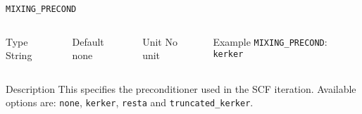 \documentclass[xcolor=dvipsnames,t]{beamer}
\begin{document}
\begin{frame}[allowframebreaks]{\texttt{MIXING\_PRECOND}} \label{MIXING_PRECOND}
\vspace*{-12pt}
\begin{columns}
\begin{block}{Type}
String
\end{block}

\begin{block}{Default}
none
\end{block}

\begin{block}{Unit}
No unit
\end{block}

\begin{block}{Example}
\texttt{MIXING\_PRECOND}: \texttt{kerker}
\end{block}
\end{columns}

\begin{block}{Description}
This specifies the preconditioner used in the SCF iteration. Available options are: \texttt{none}, \texttt{kerker}, \texttt{resta} and \texttt{truncated\_kerker}.
\end{block}

\end{frame}
\end{document}
